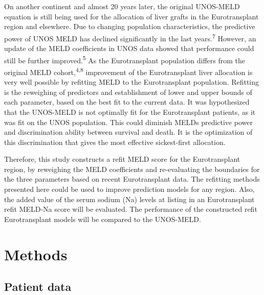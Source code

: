 \documentclass[11pt,english,]{book} %
\begin{document}
On another continent and almost 20 years later, the original UNOS-MELD equation is still being used for the allocation of liver grafts in the Eurotransplant region and elsewhere. Due to changing population characteristics, the predictive power of UNOS MELD has declined significantly in the last years.\textsuperscript{7} However, an update of the MELD coefficients in UNOS data showed that performance could still be further improved.\textsuperscript{5} As the Eurotransplant population differs from the original MELD cohort,\textsuperscript{4,8} improvement of the Eurotransplant liver allocation is very well possible by refitting MELD to the Eurotransplant population. Refitting is the reweighing of predictors and establishment of lower and upper bounds of each parameter, based on the best fit to the current data. It was hypothesized that the UNOS-MELD is not optimally fit for the Eurotransplant patients, as it was fit on the UNOS population. This could diminish MELDs predictive power and discrimination ability between survival and death. It is the optimization of this discrimination that gives the most effective sickest-first allocation.

Therefore, this study constructs a refit MELD score for the Eurotransplant region, by reweighing the MELD coefficients and re-evaluating the boundaries for the three parameters based on recent Eurotransplant data. The refitting methods presented here could be used to improve prediction models for any region. Also, the added value of the serum sodium (Na) levels at listing in an Eurotransplant refit MELD-Na score will be evaluated. The performance of the constructed refit Eurotransplant models will be compared to the UNOS-MELD.

\hypertarget{methods-1}{%
\section*{Methods}\label{methods-1}}

\hypertarget{patient-data}{%
\subsection*{Patient data}\label{patient-data}}
\end{document}
